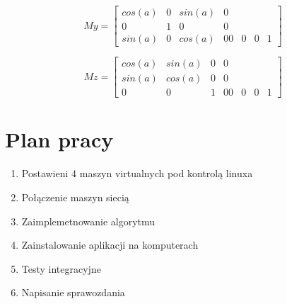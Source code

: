 \documentclass{article}
\begin{document}
\[
 My = \begin{bmatrix}
       cos(a) & 0 & sin(a) & 0 \\[0.3em]
       0 & 1 & 0 & 0 \\[0.3em]
       sin(a) & 0 & cos(a) & 0
       0 & 0 & 0 & 1
     \end{bmatrix}
\]

\[
 Mz = \begin{bmatrix}
       cos(a) & sin(a) & 0 & 0 \\[0.3em]
       sin(a) & cos(a) & 0 & 0 \\[0.3em]
       0 & 0 & 1 & 0
       0 & 0 & 0 & 1
     \end{bmatrix}
\]




\section{Plan pracy}
\begin{enumerate}
\item Postawieni 4 maszyn virtualnych pod kontrolą linuxa
\item Połączenie maszyn siecią
\item Zaimplemetnowanie algorytmu
\item Zainstalowanie aplikacji na komputerach
\item Testy integracyjne
\item Napisanie sprawozdania
\end{enumerate}
\end{document}
